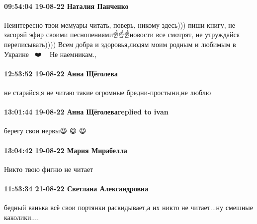  
 
 
 
 

\paragraph{09:54:04 19-08-22 Наталия Панченко}

Неинтересно твои мемуары читать, поверь, никому здесь))) пиши книгу, не засоряй
эфир своими песнопениями☝️☝️☝️новости все смотрят, не утруждайся переписывать))))
Всем добра и здоровья,людям моим родным и любимым в Украине🥰🥰🥰❤️🤗🤗🤗 Не
наемникам.,

\paragraph{12:53:52 19-08-22 Анна Щёголева}

не старайся,я не читаю такие огромные бредни-простыни,не люблю

\paragraph{13:01:44 19-08-22 Анна Щёголеваreplied to ivan}

берегу свои нервы😆 😆 😆

\paragraph{13:04:42 19-08-22 Мария Мирабелла}

Никто твою фигню не читает🤣🤣🤣

\paragraph{11:53:34 21-08-22 Светлана Александровна}

бедный ванька всё свои портянки раскидывает,а их никто не читает...ну смешные
каколики....
